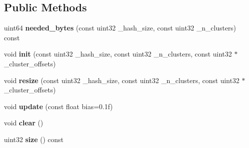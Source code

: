 \subsection*{Public Methods}
\begin{DoxyCompactItemize}
\item 
\mbox{\label{struct_clustered_r_l_storage_a3731b06b8bffb45d81cacbdc915e9f1d}} 
uint64 {\bfseries needed\+\_\+bytes} (const uint32 \+\_\+hash\+\_\+size, const uint32 \+\_\+n\+\_\+clusters) const
\item 
\mbox{\label{struct_clustered_r_l_storage_a143a5bf05f78ce5f085d9ca5ee8c8442}} 
void {\bfseries init} (const uint32 \+\_\+hash\+\_\+size, const uint32 \+\_\+n\+\_\+clusters, const uint32 $\ast$\+\_\+cluster\+\_\+offsets)
\item 
\mbox{\label{struct_clustered_r_l_storage_ad12cc46508974f99ae6db1894b8d712e}} 
void {\bfseries resize} (const uint32 \+\_\+hash\+\_\+size, const uint32 \+\_\+n\+\_\+clusters, const uint32 $\ast$\+\_\+cluster\+\_\+offsets)
\item 
\mbox{\label{struct_clustered_r_l_storage_a8e1c6f4731566515705afc77c46412f1}} 
void {\bfseries update} (const float bias=0.\+1f)
\item 
\mbox{\label{struct_clustered_r_l_storage_a1937674e3486d060f08bc9212330ab0e}} 
void {\bfseries clear} ()
\item 
\mbox{\label{struct_clustered_r_l_storage_a47aae2f04a21d8f3cbc53d0b94739673}} 
uint32 {\bfseries size} () const
\end{DoxyCompactItemize}

